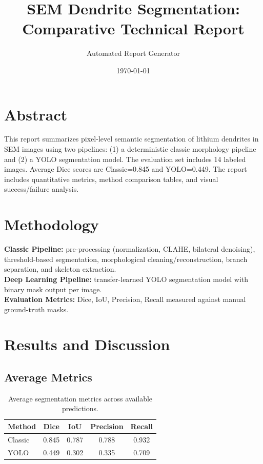\documentclass[11pt,a4paper]{article}
\title{SEM Dendrite Segmentation: Comparative Technical Report}
\author{Automated Report Generator}
\date{\today}
\begin{document}
\maketitle

\section*{Abstract}
This report summarizes pixel-level semantic segmentation of lithium dendrites in SEM images using two pipelines:
(1) a deterministic classic morphology pipeline and
(2) a YOLO segmentation model.
The evaluation set includes 14 labeled images.
Average Dice scores are Classic=0.845 and YOLO=0.449.
The report includes quantitative metrics, method comparison tables, and visual success/failure analysis.

\section*{Methodology}
\textbf{Classic Pipeline:} pre-processing (normalization, CLAHE, bilateral denoising), threshold-based segmentation,
morphological cleaning/reconstruction, branch separation, and skeleton extraction.\\
\textbf{Deep Learning Pipeline:} transfer-learned YOLO segmentation model with binary mask output per image.\\
\textbf{Evaluation Metrics:} Dice, IoU, Precision, Recall measured against manual ground-truth masks.

\section*{Results and Discussion}
\subsection*{Average Metrics}
\begin{table}[H]
\centering
\begin{tabular}{lcccc}
\toprule
Method & Dice & IoU & Precision & Recall \\
\midrule
Classic & 0.845 & 0.787 & 0.788 & 0.932 \\
YOLO & 0.449 & 0.302 & 0.335 & 0.709 \\
\bottomrule
\end{tabular}
\caption{Average segmentation metrics across available predictions.}
\end{table}
\end{document}
